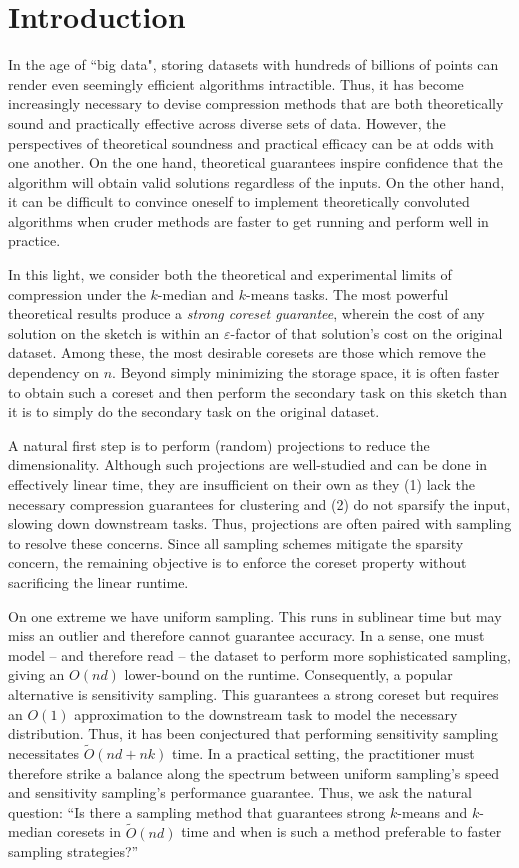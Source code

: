 \section{Introduction}

In the age of ``big data", storing datasets with hundreds of billions of points can render even seemingly efficient algorithms intractible. Thus, it has become
increasingly necessary to devise compression methods that are both theoretically sound and practically effective across diverse sets of data.
However, the perspectives of theoretical soundness and practical efficacy can be at odds with one another. On the one hand, theoretical
guarantees inspire confidence that the algorithm will obtain valid solutions regardless of the inputs. On the other hand, it can be difficult to convince
oneself to implement theoretically convoluted algorithms when cruder methods are faster to get running and perform well in practice.

In this light, we consider both the theoretical and experimental limits of compression under the $k$-median and $k$-means tasks.
The most powerful theoretical results produce a \emph{strong coreset guarantee}, wherein the cost of any solution on the sketch is within an
$\varepsilon$-factor of that solution's cost on the original dataset. Among these, the most desirable coresets are those which remove the dependency on $n$.
Beyond simply minimizing the storage space, it is often faster to obtain such a coreset and then perform the secondary task on this sketch
than it is to simply do the secondary task on the original dataset.

A natural first step is to perform (random) projections to reduce the dimensionality. Although such projections are well-studied and can be done
in effectively linear time, they are insufficient on their own as they (1) lack the necessary compression guarantees for clustering and (2) do not
sparsify the input, slowing down downstream tasks. Thus, projections are often paired with sampling to resolve these concerns. Since all sampling schemes
mitigate the sparsity concern, the remaining objective is to enforce the coreset property without sacrificing the linear runtime.

On one extreme we have uniform sampling. This runs in sublinear time but may miss an outlier and therefore cannot guarantee accuracy.
In a sense, one must model -- and therefore read -- the dataset to perform more sophisticated sampling, giving an $O(nd)$ lower-bound on
the runtime. Consequently, a popular alternative is sensitivity sampling. This guarantees a strong coreset but requires an $O(1)$ approximation to the downstream task to
model the necessary distribution. Thus, it has been conjectured that performing sensitivity sampling necessitates $\tilde{O}(nd + nk)$ time.
In a practical setting, the practitioner must therefore strike a balance along the spectrum between uniform sampling's speed and sensitivity sampling's
performance guarantee. Thus, we ask the natural question: ``Is there a sampling method that guarantees strong $k$-means
and $k$-median coresets in $\tilde{O}(nd)$ time and when is such a method preferable to faster sampling strategies?''

